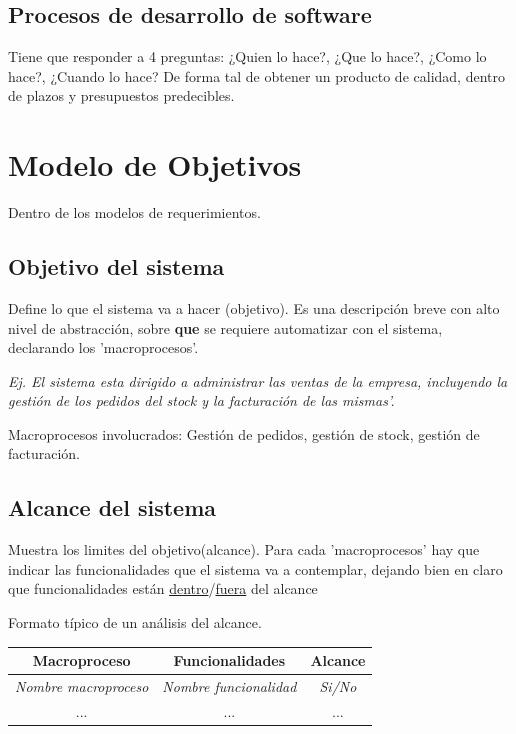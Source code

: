 \documentclass[titlepage,a4paper]{article}
\begin{document}
\subsection{Procesos de desarrollo de software}

Tiene que responder a 4 preguntas: ¿Quien lo hace?, ¿Que lo hace?, ¿Como lo hace?, ¿Cuando lo hace?
De forma tal de obtener un producto de calidad, dentro de plazos y presupuestos predecibles.

\section{Modelo de Objetivos}
Dentro de los modelos de requerimientos.
\subsection{Objetivo del sistema}
Define lo que el sistema va a hacer (objetivo).
Es una descripción breve con alto nivel de abstracción, sobre \textbf{que} se requiere automatizar con el sistema, declarando los 'macroprocesos'.

\textit{Ej.
El sistema esta dirigido a administrar las ventas de la empresa, incluyendo la gestión de los pedidos del stock y la facturación de las mismas'.}

Macroprocesos involucrados: Gestión de pedidos, gestión de stock, gestión de facturación.

\subsection{Alcance del sistema}
Muestra los limites del objetivo(alcance). Para cada 'macroprocesos' hay que indicar las funcionalidades que el sistema va a contemplar,
dejando bien en claro que funcionalidades están \underline{dentro}/\underline{fuera} del alcance

Formato típico de un análisis del alcance.



\begin{table}[]
\begin{center}
\begin{tabular}{|l|l|c|}
\hline
\multicolumn{1}{|c|}{Macroproceso} & \multicolumn{1}{c|}{Funcionalidades} & Alcance \\ \hline
\textit{Nombre macroproceso}      & \textit{Nombre funcionalidad}       & \textit{Si/No} \\ \hline
 \multicolumn{1}{|c|}{...}          & \multicolumn{1}{c|}{...}            & ...            \\ \hline
\end{tabular}
\end{center}
\end{table}
\end{document}
